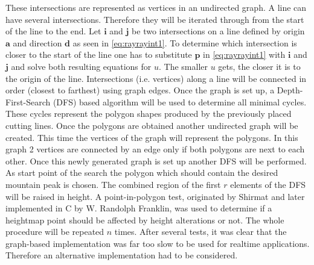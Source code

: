 \documentclass[11pt,a4paper,twoside,openright]{report}
\begin{document}
These intersections are represented as vertices in an undirected graph. A line can have several intersections. Therefore they will be iterated through from the start of the line to the end. Let $\mathbf{i}$ and $\mathbf{j}$ be two intersections on a line defined by origin $\mathbf{a}$ and direction $\mathbf{d}$ as seen in \cref{eq:rayrayint1}. To determine which intersection is closer to the start of the line one has to substitute $\mathbf{p}$ in \cref{eq:rayrayint1} with $\mathbf{i}$ and $\mathbf{j}$ and solve both resulting equations for $u$. The smaller $u$ gets, the closer it is to the origin of the line. Intersections (i.e. vertices) along a line will be connected in order (closest to farthest) using graph edges. Once the graph is set up, a Depth-First-Search (DFS) based algorithm will be used to determine all minimal cycles. These cycles represent the polygon shapes produced by the previously placed cutting lines. Once the polygons are obtained another undirected graph will be created. This time the vertices of the graph will represent the polygons. In this graph 2 vertices are connected by an edge only if both polygons are next to each other. Once this newly generated graph is set up another DFS will be performed. As start point of the search the polygon which should contain the desired mountain peak is chosen. The combined region of the first $r$ elements of the DFS will be raised in height. A point-in-polygon test, originated by Shirmat \cite{Shimrat:1962:APP:368637.368653} and later implemented in C by W. Randolph Franklin, was used to determine if a heightmap point should be affected by height alterations or not. The whole procedure will be repeated $n$ times. After several tests, it was clear that the graph-based implementation was far too slow to be used for realtime applications. Therefore an alternative implementation had to be considered.
\end{document}

